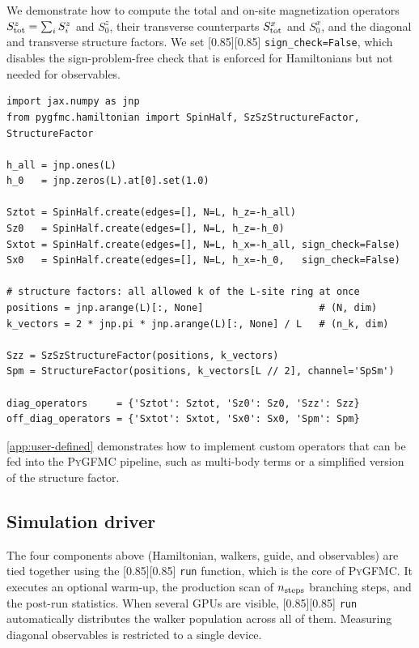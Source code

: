 \documentclass{SciPost}
\newcommand{\pyinline}[1]{\begingroup\setlength{\fboxsep}{0pt}%
  \colorbox{gray!15}{\raisebox{0pt}[0.85\ht\strutbox][0.85\dp\strutbox]{%
    \hspace{1pt}\lstinline{#1}\hspace{1pt}}}\endgroup}
\newcommand{\nsteps}{n_{\rm steps}}
\providecommand{\PyGFMC}{\textsc{PyGFMC}}
\begin{document}
We demonstrate how to compute the total and on-site magnetization operators $S^z_{\rm tot} = \sum_i S^z_i$ and $S^z_0$, their transverse counterparts $S^x_{\rm tot}$ and $S^x_0$, and the diagonal and transverse structure factors.
%
We set \pyinline{sign_check=False}, which disables the sign-problem-free check that is enforced for Hamiltonians but not needed for observables.
\begin{lstlisting}
import jax.numpy as jnp
from pygfmc.hamiltonian import SpinHalf, SzSzStructureFactor, StructureFactor

h_all = jnp.ones(L)
h_0   = jnp.zeros(L).at[0].set(1.0)

Sztot = SpinHalf.create(edges=[], N=L, h_z=-h_all)
Sz0   = SpinHalf.create(edges=[], N=L, h_z=-h_0)
Sxtot = SpinHalf.create(edges=[], N=L, h_x=-h_all, sign_check=False)
Sx0   = SpinHalf.create(edges=[], N=L, h_x=-h_0,   sign_check=False)

# structure factors: all allowed k of the L-site ring at once
positions = jnp.arange(L)[:, None]                    # (N, dim)
k_vectors = 2 * jnp.pi * jnp.arange(L)[:, None] / L   # (n_k, dim)

Szz = SzSzStructureFactor(positions, k_vectors)
Spm = StructureFactor(positions, k_vectors[L // 2], channel='SpSm')

diag_operators     = {'Sztot': Sztot, 'Sz0': Sz0, 'Szz': Szz}
off_diag_operators = {'Sxtot': Sxtot, 'Sx0': Sx0, 'Spm': Spm}
\end{lstlisting}
\autoref{app:user-defined} demonstrates how to implement custom operators that can be fed into the \PyGFMC{} pipeline, such as multi-body terms or a simplified version of the structure factor.

\subsection{Simulation driver}\label{sec:pkg:driver}
The four components above (Hamiltonian, walkers, guide, and observables) are tied together using the \pyinline{run} function, which is the core of \PyGFMC{}.
%
It executes an optional warm-up, the production scan of $\nsteps$ branching steps, and the post-run statistics.
%
When several GPUs are visible, \pyinline{run} automatically distributes the walker population across all of them.
%
Measuring diagonal observables is restricted to a single device.
\end{document}
